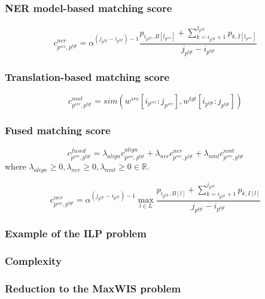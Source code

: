 \documentclass{beamer}
\newcommand{\src}[1]{#1^{src}}
\newcommand{\tgt}[1]{#1^{tgt}}
\begin{document}
\begin{frame}
  \frametitle{NER model-based matching score}

  \begin{equation*}
    c_{\src{p}, \tgt{p}}^{ner} = \alpha^{(j_{\tgt{p}} - i_{\tgt{p}}) - 1}
    \frac{
      p_{i_{\tgt{p}}, B[l_{\src{p}}]} +
      \sum\limits_{k = i_{\tgt{p}} + 1}^{j_{\tgt{p}}} p_{k, I[l_{\src{p}}]}
    }
    {j_{\tgt{p}} - i_{\tgt{p}}}
  \end{equation*}
\end{frame}

\begin{frame}
  \frametitle{Translation-based matching score}

  \begin{equation*}
    c_{\src{p}, \tgt{p}}^{nmt} =
    sim \left(\src{w}[i_{\src{p}} : j_{\src{p}}],
    \tgt{w}[i_{\tgt{p}} : j_{\tgt{p}}] \right)
  \end{equation*}
\end{frame}

\begin{frame}
  \frametitle{Fused matching score}

  \begin{equation*}
    c_{\src{p}, \tgt{p}}^{fused} =
    \lambda_{align} c_{\src{p}, \tgt{p}}^{align} +
    \lambda_{ner} c_{\src{p}, \tgt{p}}^{ner} +
    \lambda_{nmt} c_{\src{p}, \tgt{p}}^{nmt}
  \end{equation*}
  where \( \lambda_{align} \geq 0, \lambda_{ner} \geq 0, \lambda_{nmt} \geq 0 \in \mathbb{R}\).

  \begin{equation*}
    c_{\src{p}, \tgt{p}}^{ner} = \alpha^{(j_{\tgt{p}} - i_{\tgt{p}}) - 1}
    \max\limits_{l \in L}
    \frac{
      p_{i_{\tgt{p}}, B[l]} +
      \sum\limits_{k = i_{\tgt{p}} + 1}^{j_{\tgt{p}}} p_{k, I[l]}
    }
    {j_{\tgt{p}} - i_{\tgt{p}}}
  \end{equation*}
\end{frame}

\begin{frame}
  \frametitle{Example of the ILP problem}
\end{frame}

\begin{frame}
  \frametitle{Complexity}
\end{frame}

\begin{frame}
  \frametitle{Reduction to the MaxWIS problem}
\end{frame}
\end{document}
